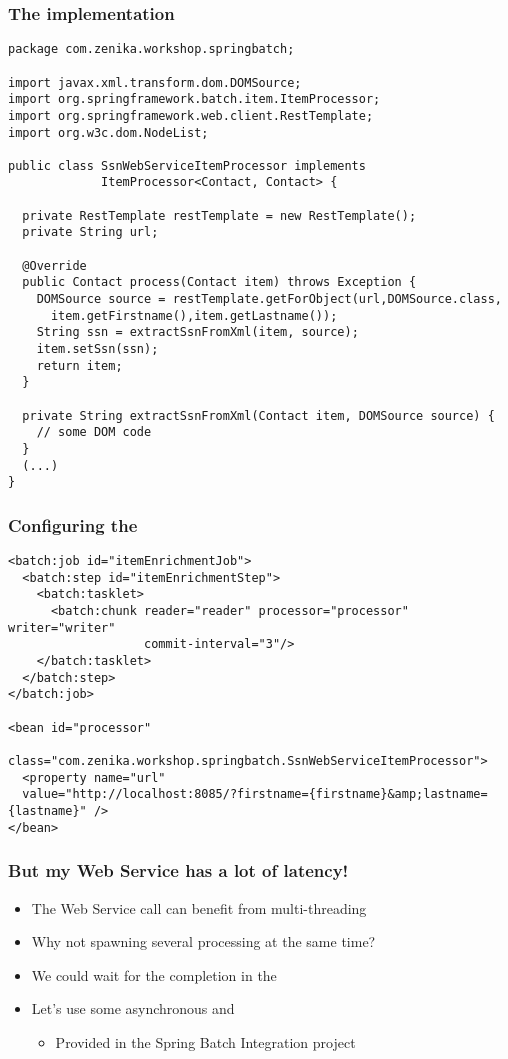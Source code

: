 \begin{frame}[fragile]
\frametitle{The  implementation}
\lstset{language=Java}
\begin{lstlisting}
package com.zenika.workshop.springbatch;

import javax.xml.transform.dom.DOMSource;
import org.springframework.batch.item.ItemProcessor;
import org.springframework.web.client.RestTemplate;
import org.w3c.dom.NodeList;

public class SsnWebServiceItemProcessor implements
             ItemProcessor<Contact, Contact> {
	
  private RestTemplate restTemplate = new RestTemplate();
  private String url;

  @Override
  public Contact process(Contact item) throws Exception {
    DOMSource source = restTemplate.getForObject(url,DOMSource.class, 
      item.getFirstname(),item.getLastname());
    String ssn = extractSsnFromXml(item, source);
    item.setSsn(ssn);
    return item;
  }

  private String extractSsnFromXml(Contact item, DOMSource source) {
    // some DOM code
  }
  (...)
}
\end{lstlisting}
\end{frame}

\begin{frame}[fragile]
\frametitle{Configuring the }
\lstset{language=XML}
\begin{lstlisting}
<batch:job id="itemEnrichmentJob">
  <batch:step id="itemEnrichmentStep">
    <batch:tasklet>
      <batch:chunk reader="reader" processor="processor" writer="writer" 
                   commit-interval="3"/>
    </batch:tasklet>
  </batch:step>
</batch:job>

<bean id="processor" 
      class="com.zenika.workshop.springbatch.SsnWebServiceItemProcessor">
  <property name="url" 
  value="http://localhost:8085/?firstname={firstname}&amp;lastname={lastname}" />
</bean>
\end{lstlisting}
\end{frame}

\begin{frame}
 \frametitle{But my Web Service has a lot of latency!}
 \begin{itemize}
  \item The Web Service call can benefit from multi-threading
  \item Why not spawning several processing at the same time?
  \item We could wait for the completion in the 
  \item Let's use some asynchronous  and 
  \begin{itemize}
    \item Provided in the Spring Batch Integration project
  \end{itemize}  
 \end{itemize}
\end{frame}

